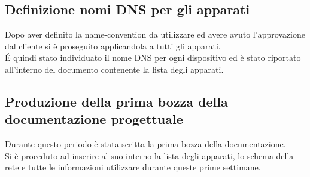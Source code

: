 \documentclass[Realizzazione.tex]{subfiles}
\begin{document}
\subsection{Definizione nomi DNS per gli apparati}
Dopo aver definito la name-convention da utilizzare ed avere avuto l'approvazione dal cliente si è proseguito applicandola a tutti gli apparati. \\
\'E quindi stato individuato il nome DNS per ogni dispositivo ed è stato riportato all'interno del documento contenente la lista degli apparati.

\subsection{Produzione della prima bozza della documentazione progettuale}
Durante questo periodo è stata scritta la prima bozza della documentazione. \\
Si è proceduto ad inserire al suo interno la lista degli apparati, lo schema della rete e tutte le informazioni utilizzare durante queste prime settimane.
\end{document}
